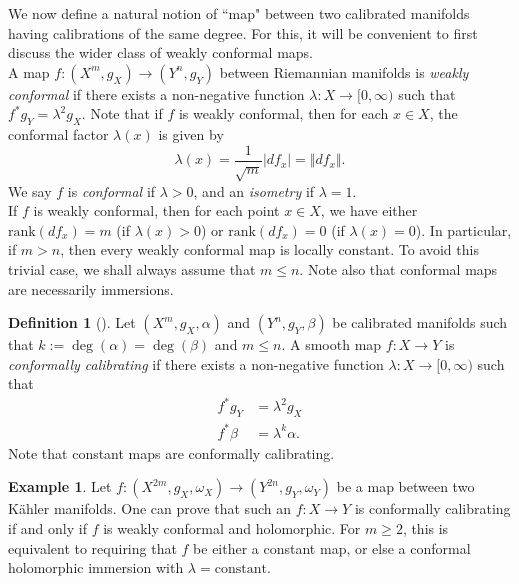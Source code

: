\documentclass[11pt]{article}
\theoremstyle{definition}
\newtheorem{defn}[thm]{Definition}
\newtheorem{example}[thm]{Example}
\numberwithin{equation}{section}
\begin{document}
\indent \indent We now define a natural notion of ``map" between two calibrated manifolds having calibrations of the same degree.  For this, it will be convenient to first discuss the wider class of weakly conformal maps. \\
\indent A map $f \colon (X^m, g_X) \to (Y^n, g_Y)$ between Riemannian manifolds is \emph{weakly conformal} if there exists a non-negative function $\lambda \colon X \to [0,\infty)$ such that $f^*g_Y = \lambda^2 g_X$.  Note that if $f$ is weakly conformal, then for each $x \in X$, the conformal factor $\lambda(x)$ is given by
\begin{equation} \label{eq:Lambda}
\lambda(x) = \frac{1}{\sqrt{m}}|df_x| = \Vert df_x \Vert.
\end{equation}
We say $f$ is \emph{conformal} if $\lambda > 0$, and an \emph{isometry} if $\lambda = 1$. \\
\indent If $f$ is weakly conformal, then for each point $x \in X$, we have either $\mathrm{rank}(df_x) = m$ (if $\lambda(x) > 0$) or $\mathrm{rank}(df_x) = 0$ (if $\lambda(x) = 0$).  In particular, if $m > n$, then every weakly conformal map is locally constant.  To avoid this trivial case, we shall always assume that $m \leq n$.  Note also that conformal maps are necessarily immersions.

\begin{defn}[\cite{cheng2021bubble}] Let $(X^m, g_X, \alpha)$ and $(Y^n, g_Y, \beta)$ be calibrated manifolds such that $k := \deg(\alpha) = \deg(\beta)$ and $m \leq n$.  A smooth map $f \colon X \to Y$ is \emph{conformally calibrating} if there exists a non-negative function $\lambda \colon X \to [0,\infty)$ such that
\begin{align*}
f^*g_Y & = \lambda^2 g_X \\
f^*\beta & = \lambda^k \alpha.
\end{align*}
Note that constant maps are conformally calibrating.
\end{defn}

\begin{example} Let $f \colon (X^{2m}, g_X, \omega_X) \to (Y^{2n}, g_Y, \omega_Y)$ be a map between two K\"{a}hler manifolds.  One can prove that such an $f \colon X \to Y$ is conformally calibrating if and only if $f$ is weakly conformal and holomorphic.  For $m \geq 2$, this is equivalent to requiring that $f$ be either a constant map, or else a conformal holomorphic immersion with $\lambda = \text{constant}$.
\end{example}
\end{document}
